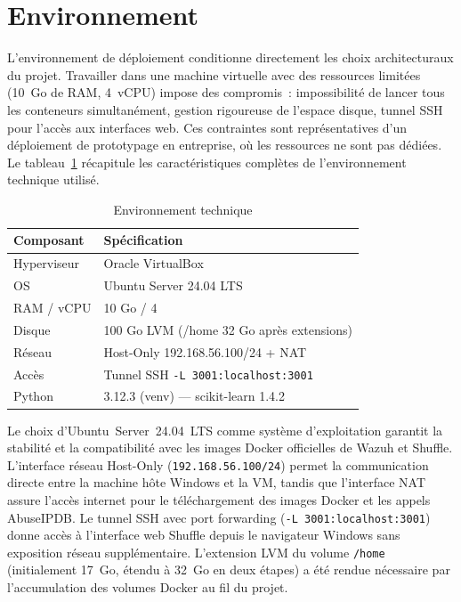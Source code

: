 \documentclass[12pt,a4paper]{report}
\begin{document}
\section{Environnement}

L'environnement de déploiement conditionne directement les choix architecturaux du projet. Travailler dans une machine virtuelle avec des ressources limitées (10~Go de RAM, 4~vCPU) impose des compromis~: impossibilité de lancer tous les conteneurs simultanément, gestion rigoureuse de l'espace disque, tunnel SSH pour l'accès aux interfaces web. Ces contraintes sont représentatives d'un déploiement de prototypage en entreprise, où les ressources ne sont pas dédiées. Le tableau~\ref{tab:env} récapitule les caractéristiques complètes de l'environnement technique utilisé.

\begin{table}[H]
\centering
\caption{Environnement technique}
\label{tab:env}
\begin{tabular}{|l|l|}
\hline
\rowcolor{ColSection!15}
\textbf{Composant} & \textbf{Spécification} \\
\hline
Hyperviseur    & Oracle VirtualBox \\
OS             & Ubuntu Server 24.04 LTS \\
RAM / vCPU     & 10 Go / 4 \\
Disque         & 100 Go LVM (/home 32 Go après extensions) \\
Réseau         & Host-Only 192.168.56.100/24 + NAT \\
Accès          & Tunnel SSH \texttt{-L 3001:localhost:3001} \\
Python         & 3.12.3 (venv) — scikit-learn 1.4.2 \\
\hline
\end{tabular}
\end{table}

Le choix d'Ubuntu~Server~24.04~LTS comme système d'exploitation garantit la stabilité et la compatibilité avec les images Docker officielles de Wazuh et Shuffle. L'interface réseau Host-Only (\texttt{192.168.56.100/24}) permet la communication directe entre la machine hôte Windows et la VM, tandis que l'interface NAT assure l'accès internet pour le téléchargement des images Docker et les appels AbuseIPDB. Le tunnel SSH avec port forwarding (\texttt{-L 3001:localhost:3001}) donne accès à l'interface web Shuffle depuis le navigateur Windows sans exposition réseau supplémentaire. L'extension LVM du volume \texttt{/home} (initialement 17~Go, étendu à 32~Go en deux étapes) a été rendue nécessaire par l'accumulation des volumes Docker au fil du projet.
\end{document}

